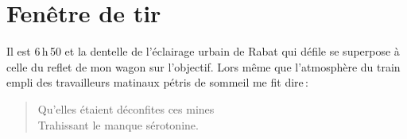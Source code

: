 \section*{Fenêtre de tir}
\begin{prose}
  {I}{l est 6\,h\,50 et la dentelle de l’éclairage urbain de Rabat} qui défile se superpose à celle du reflet de mon wagon sur l’objectif. Lors même que l’atmosphère du train empli des travailleurs matinaux pétris de sommeil me fit dire\,:
\end{prose}

\begin{verse}%
  \distique
  Qu’elles étaient déconfites ces mines\\ 
  Trahissant le manque sérotonine.
\end{verse}


